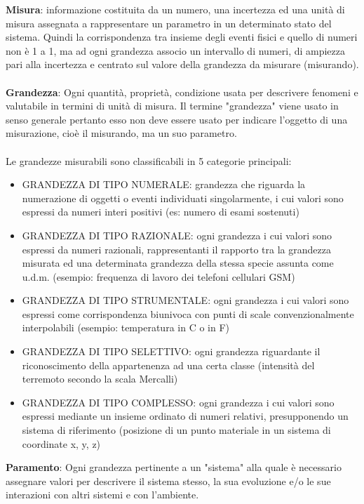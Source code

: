 \documentclass{article}
\begin{document}
\textbf{Misura}: informazione costituita da un numero, una incertezza ed una unità di misura assegnata a 
rappresentare un parametro in un determinato stato del sistema. 
Quindi la corrispondenza tra insieme degli eventi fisici e quello di numeri non è 1 a 1, ma ad ogni 
grandezza associo un intervallo di numeri, di ampiezza pari alla incertezza e centrato sul valore 
della grandezza da misurare (misurando). \\ \\
\textbf{Grandezza}: Ogni quantità, proprietà, condizione usata per descrivere fenomeni e valutabile in 
termini di 
unità di misura. Il termine "grandezza" viene usato in senso generale pertanto esso non deve 
essere usato per indicare l'oggetto di una misurazione, cioè il misurando, ma un suo parametro. \\ \\ 
Le grandezze misurabili sono classificabili in 5 categorie principali: 
\begin{itemize}
    \item GRANDEZZA DI TIPO NUMERALE: grandezza che riguarda la numerazione di oggetti o eventi individuati singolarmente, i cui valori sono espressi da numeri interi positivi (es: numero di esami sostenuti) 
    \item GRANDEZZA DI TIPO RAZIONALE: ogni grandezza i cui valori sono espressi da numeri razionali, rappresentanti il rapporto tra la grandezza misurata ed una determinata grandezza della stessa specie assunta come u.d.m. (esempio: frequenza di lavoro dei telefoni cellulari GSM) 
    \item GRANDEZZA DI TIPO STRUMENTALE: ogni grandezza i cui valori sono espressi come corrispondenza biunivoca con punti di scale convenzionalmente interpolabili (esempio: temperatura in C o in F)
    \item GRANDEZZA DI TIPO SELETTIVO: ogni grandezza riguardante il riconoscimento della appartenenza ad una certa classe (intensità del terremoto secondo la scala Mercalli) 
    \item GRANDEZZA DI TIPO COMPLESSO: ogni grandezza i cui valori sono espressi mediante un insieme ordinato di numeri relativi, presupponendo un sistema di riferimento (posizione di un punto materiale in un sistema di coordinate x, y, z) 
\end{itemize}
\textbf{Paramento}: Ogni grandezza pertinente a un "sistema" alla quale è necessario assegnare valori per descrivere il sistema stesso, la sua evoluzione e/o le sue interazioni con altri sistemi e con l'ambiente. \\ \\
\end{document}
